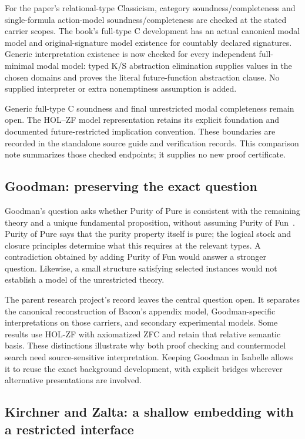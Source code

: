 \documentclass[12pt,leqno]{article}
\begin{document}
For the paper's relational-type Classicism, category soundness/completeness
and single-formula action-model soundness/completeness are checked at the
stated carrier scopes. The book's full-type C development has an actual
canonical modal model and original-signature model existence for countably
declared signatures. Generic interpretation existence is now checked for
every independent full-minimal modal model: typed K/S abstraction elimination
supplies values in the chosen domains and proves the literal future-function
abstraction clause. No supplied interpreter or extra nonemptiness
assumption is added.

Generic full-type C soundness and final unrestricted modal completeness
remain open. The HOL--ZF model representation retains its explicit
foundation and documented future-restricted implication convention.
These boundaries are recorded in the standalone source guide and
verification records. This comparison note summarizes those checked
endpoints; it supplies no new proof certificate.

\subsection{Goodman: preserving the exact question}

Goodman's question asks whether Purity of Pure is consistent with the
remaining theory and a unique fundamental proposition, without assuming
Purity of Fun~\cite{goodman}. Purity of Pure says that the purity property
itself is pure; the logical stock and closure principles determine what this
requires at the relevant types. A contradiction obtained by adding Purity of
Fun would answer a stronger question. Likewise, a small structure satisfying
selected instances would not establish a model of the unrestricted theory.

The parent research project's record leaves the central question open. It separates
the canonical reconstruction of Bacon's appendix model, Goodman-specific
interpretations on those carriers, and secondary experimental models. Some
results use HOL-ZF with axiomatized ZFC and retain that relative semantic
basis. These distinctions illustrate why both proof checking and
countermodel search need source-sensitive interpretation. Keeping Goodman
in Isabelle allows it to reuse the exact background development, with
explicit bridges wherever alternative presentations are involved.

\subsection{Kirchner and Zalta: a shallow embedding with a restricted interface}
\end{document}
